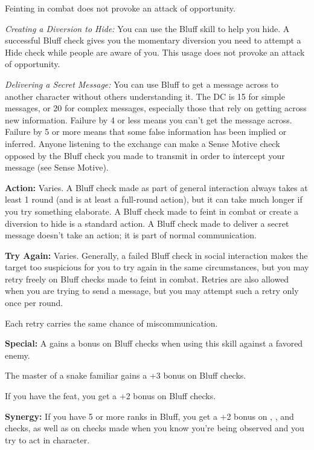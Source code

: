 Feinting in combat does not provoke an attack of opportunity.

\textit{Creating a Diversion to Hide:} You can use the Bluff skill to help you 
hide. A successful Bluff check gives you the momentary diversion you need to attempt 
a Hide check while people are aware of you. This usage does not provoke an attack 
of opportunity.

\textit{Delivering a Secret Message:} You can use Bluff to get a message across 
to another character without others understanding it. The DC is 15 for simple messages, 
or 20 for complex messages, especially those that rely on getting across new information. 
Failure by 4 or less means you can't get the message across. Failure by 5 or more 
means that some false information has been implied or inferred. Anyone listening 
to the exchange can make a Sense Motive check opposed by the Bluff check you made 
to transmit in order to intercept your message (see Sense Motive).

\textbf{Action:} Varies. A Bluff check made as part of general interaction always 
takes at least 1 round (and is at least a full-round action), but it can take much 
longer if you try something elaborate. A Bluff check made to feint in combat or 
create a diversion to hide is a standard action. A Bluff check made to deliver 
a secret message doesn't take an action; it is part of normal communication.

\textbf{Try Again:} Varies. Generally, a failed Bluff check in social interaction 
makes the target too suspicious for you to try again in the same circumstances, 
but you may retry freely on Bluff checks made to feint in combat. Retries are also 
allowed when you are trying to send a message, but you may attempt such a retry 
only once per round.

Each retry carries the same chance of miscommunication.

\textbf{Special:} A  gains a bonus on Bluff checks when using this skill 
against a favored enemy.

The master of a snake familiar gains a +3 bonus on Bluff checks.

If you have the  feat, you get a +2 bonus on Bluff checks.

\textbf{Synergy:} If you have 5 or more ranks in Bluff, you get a +2 bonus on , 
, and  checks, as well as on  checks made when 
you know you're being observed and you try to act in character.

